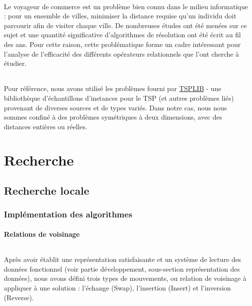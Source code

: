 \documentclass[a4paper,10pt]{report}
\begin{document}
\paragraph{}
  Le voyageur de commerce est un problème bien connu dans le milieu informatique : pour un ensemble de villes,
minimiser la distance requise qu'un individu doit parcourir afin de visiter chaque ville. De nombreuses études
ont été menées sur ce sujet et une quantité significative d'algorithmes de résolution ont été écrit au fil des
ans. Pour cette raison, cette problématique forme un cadre intéressant pour l'analyse de l'efficacité des différents
opérateurs relationnels que l'ont cherche à étudier.

\paragraph{} %
  Pour référence, nous avons utilisé les problèmes fourni par
\href{https://www.iwr.uni-heidelberg.de/groups/comopt/software/TSPLIB95/}{TSPLIB}
- une bibliothèque d'échantillons d'instances pour le TSP (et autres problèmes liés) provenant de diverses sources
et de types variés. Dans notre cas, nous nous sommes confiné à des problèmes symétriques à deux dimensions, avec des
distances entières ou réelles.


\part{Recherche}
\chapter{Recherche locale}
\section{Implémentation des algorithmes}
\subsection{Relations de voisinage}

\paragraph{}
  Après avoir établit une représentation satisfaisante et un système de lecture des données fonctionnel (voir partie
développement, sous-section représentation des données), nous avons défini trois types de mouvements, ou relation de
voisinage à appliquer à une solution : l'échange (Swap), l'insertion (Insert) et l'inversion (Reverse).
\end{document}
